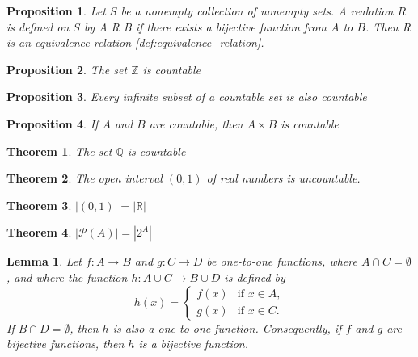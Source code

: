 \documentclass{article}
\newtheorem{theorem}{Theorem}[section]
\newtheorem{lemma}{Lemma}[section]
\newtheorem{proposition}{Proposition}[section]
\theoremstyle{definition}
\theoremstyle{remark}
\begin{document}
\begin{proposition}
Let $S$ be a nonempty collection of nonempty sets. A realation $R$ is defined on $S$ by A R B if there exists a bijective function from $A$ to $B$. Then R is an equivalence relation \ref{def:equivalence_relation}.
\end{proposition}


\begin{proposition}
The set $\mathbb{Z}$ is countable
\end{proposition}


\begin{proposition}
Every infinite subset of a countable set is also countable
\end{proposition}


\begin{proposition}
If $A$ and $B$ are countable, then $A \times B$ is countable
\end{proposition}





\begin{theorem}
The set $\mathbb{Q}$ is countable
\end{theorem}


\begin{theorem}
The open interval $(0,1)$ of real numbers is uncountable.
\end{theorem}

\begin{theorem}
\( |(0,1)| = |\mathbb{R}| \)
\end{theorem}




\begin{theorem}
\( |\mathcal{P}(A)| = |2^A| \)
\end{theorem}




\begin{lemma}

Let \( f: A \to B \) and \( g: C \to D \) be one-to-one functions, where \( A \cap C = \emptyset \), and where the function \( h: A \cup C \to B \cup D \) is defined by
\[
h(x) =
\begin{cases} 
f(x) & \text{if } x \in A, \\
g(x) & \text{if } x \in C.
\end{cases}
\]
If \( B \cap D = \emptyset \), then \( h \) is also a one-to-one function. Consequently, if \( f \) and \( g \) are bijective functions, then \( h \) is a bijective function.
\end{lemma}
\end{document}
